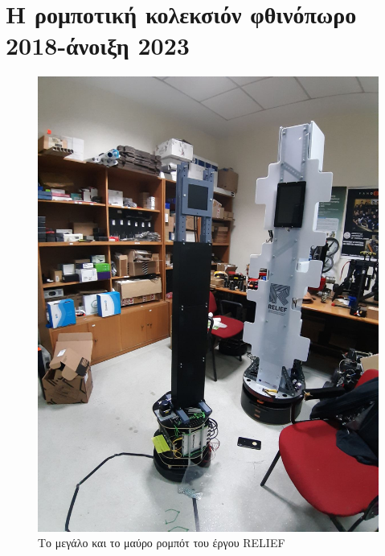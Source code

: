 \section{Η ρομποτική κολεκσιόν φθινόπωρο 2018-άνοιξη 2023}
\begin{figure}[H]\centering
  \includegraphics[scale=0.25]{./figures/parts/appendix/chapters/06/relief_robots.jpg}
  \caption{\small Το μεγάλο και το μαύρο ρομπότ του έργου RELIEF}
\end{figure}
